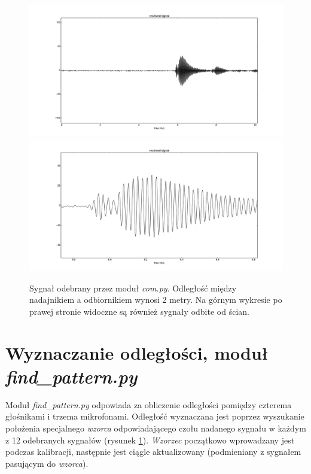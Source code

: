 \begin{figure}[h!]
    \centering
    \includegraphics[width=1.15\textwidth, trim= 47mm 0mm 0mm 0mm,clip]{com_output_2m_1}
    \includegraphics[width=1.15\textwidth, trim= 47mm 0mm 0mm 0mm,clip]{com_output_2m_2}
    \caption{Sygnał odebrany przez moduł \textit{com.py}. 
    Odległość między nadajnikiem a odbiornikiem wynosi 2 metry.
    Na górnym wykresie po prawej stronie widoczne są również sygnały odbite od ścian.
    }
    \label{fig:com_output_2m}
\end{figure}


\section{Wyznaczanie odległości, moduł \textit{find\_pattern.py}}

Moduł \textit{find\_pattern.py} odpowiada za obliczenie odległości pomiędzy czterema głośnikami i trzema mikrofonami.
Odległość wyznaczana jest poprzez wyszukanie położenia specjalnego \textit{wzorca} odpowiadającego czołu nadanego sygnału 
w każdym z 12 odebranych sygnałów (rysunek \ref{fig:com_output_2m}).
\textit{Wzorzec} początkowo wprowadzany jest podczas kalibracji, następnie jest ciągle aktualizowany 
(podmieniany z sygnałem pasującym do \textit{wzorca}).

